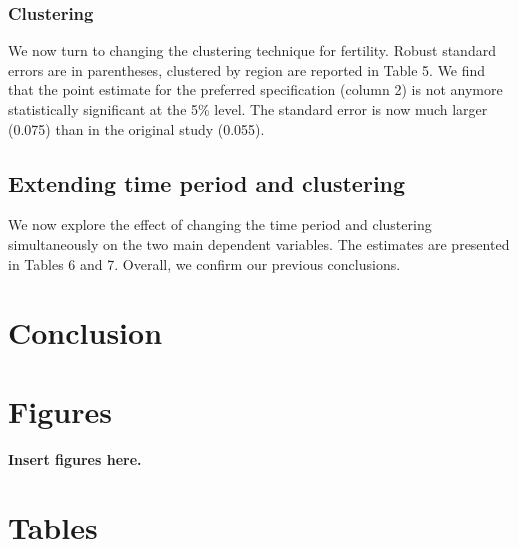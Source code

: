 \documentclass[12pt,a4paper]{article}
\begin{document}
\subsubsection{Clustering}

We now turn to changing the clustering technique for fertility. Robust standard errors are in parentheses, clustered by region are reported in Table 5. We find that the point estimate for the preferred specification (column 2) is not anymore statistically significant at the 5\% level. The standard error is now much larger (0.075) than in the original study (0.055).

\subsection{Extending time period and clustering}

We now explore the effect of changing the time period and clustering simultaneously on the two main dependent variables. The estimates are presented in Tables 6 and 7. Overall, we confirm our previous conclusions. 

\section{Conclusion}




\newpage



\newpage
\section{Figures}

\textbf{Insert figures here.}

\newpage
\section{Tables}
\end{document}
